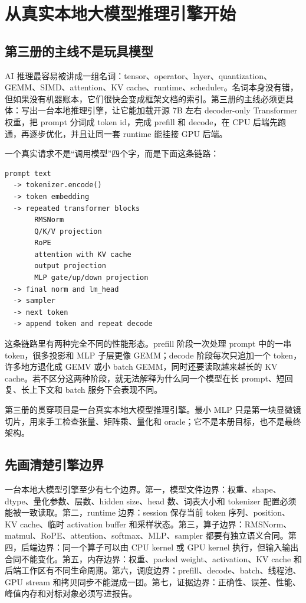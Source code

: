\section{从真实本地大模型推理引擎开始}

\subsection{第三册的主线不是玩具模型}

AI 推理最容易被讲成一组名词：tensor、operator、layer、quantization、GEMM、SIMD、attention、KV cache、runtime、scheduler。名词本身没有错，但如果没有机器账本，它们很快会变成框架文档的索引。第三册的主线必须更具体：写出一台本地推理引擎，让它能加载开源 7B 左右 decoder-only Transformer 权重，把 prompt 分词成 token id，完成 prefill 和 decode，在 CPU 后端先跑通，再逐步优化，并且让同一套 runtime 能挂接 GPU 后端。

一个真实请求不是“调用模型”四个字，而是下面这条链路：

\begin{lstlisting}[numbers=none,caption={真实本地大模型推理请求的主链路}]
prompt text
  -> tokenizer.encode()
  -> token embedding
  -> repeated transformer blocks
       RMSNorm
       Q/K/V projection
       RoPE
       attention with KV cache
       output projection
       MLP gate/up/down projection
  -> final norm and lm_head
  -> sampler
  -> next token
  -> append token and repeat decode
\end{lstlisting}

这条链路里有两种完全不同的性能形态。prefill 阶段一次处理 prompt 中的一串 token，很多投影和 MLP 子层更像 GEMM；decode 阶段每次只追加一个 token，许多地方退化成 GEMV 或小 batch GEMM，同时还要读取越来越长的 KV cache。若不区分这两种阶段，就无法解释为什么同一个模型在长 prompt、短回复、长上下文和 batch 服务下会表现不同。

\begin{keyidea}
第三册的贯穿项目是一台真实本地大模型推理引擎。最小 MLP 只是第一块显微镜切片，用来手工检查张量、矩阵乘、量化和 oracle；它不是本册目标，也不是最终架构。
\end{keyidea}

\subsection{先画清楚引擎边界}

一台本地大模型引擎至少有七个边界。第一，模型文件边界：权重、shape、dtype、量化参数、层数、hidden size、head 数、词表大小和 tokenizer 配置必须能被一致读取。第二，runtime 边界：session 保存当前 token 序列、position、KV cache、临时 activation buffer 和采样状态。第三，算子边界：RMSNorm、matmul、RoPE、attention、softmax、MLP、sampler 都要有独立语义合同。第四，后端边界：同一个算子可以由 CPU kernel 或 GPU kernel 执行，但输入输出合同不能变化。第五，内存边界：权重、packed weight、activation、KV cache 和后端工作区有不同生命周期。第六，调度边界：prefill、decode、batch、线程池、GPU stream 和拷贝同步不能混成一团。第七，证据边界：正确性、误差、性能、峰值内存和对标对象必须写进报告。

